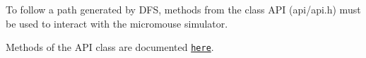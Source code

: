 To follow a path generated by D\+FS, methods from the class A\+PI (api/api.\+h) must be used to interact with the micromouse simulator.
\begin{DoxyItemize}
\item Methods of the A\+PI class are documented \href{https://github.com/mackorone/mms#summary}{\tt here}. 
\end{DoxyItemize}